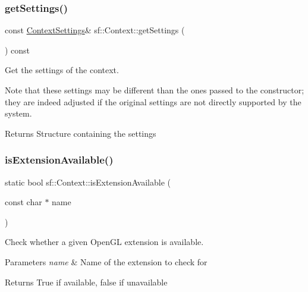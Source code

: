 \subsubsection{\texorpdfstring{getSettings()}{getSettings()}}
{\footnotesize\ttfamily const \mbox{\hyperlink{structsf_1_1_context_settings}{Context\+Settings}}\& sf\+::\+Context\+::get\+Settings (\begin{DoxyParamCaption}{ }\end{DoxyParamCaption}) const}



Get the settings of the context. 

Note that these settings may be different than the ones passed to the constructor; they are indeed adjusted if the original settings are not directly supported by the system.

\begin{DoxyReturn}{Returns}
Structure containing the settings \begin{DoxyVerb}\end{DoxyVerb}
 
\end{DoxyReturn}
\mbox{\label{classsf_1_1_context_a163c7f72c0c20133606657d895faa147}} 
\subsubsection{\texorpdfstring{isExtensionAvailable()}{isExtensionAvailable()}}
{\footnotesize\ttfamily static bool sf\+::\+Context\+::is\+Extension\+Available (\begin{DoxyParamCaption}\item[{const char $\ast$}]{name }\end{DoxyParamCaption})\hspace{0.3cm}{\ttfamily [static]}}



Check whether a given Open\+GL extension is available. 


\begin{DoxyParams}{Parameters}
{\em name} & Name of the extension to check for\\
\hline
\end{DoxyParams}
\begin{DoxyReturn}{Returns}
True if available, false if unavailable \begin{DoxyVerb}\end{DoxyVerb}
 
\end{DoxyReturn}
\mbox{\label{classsf_1_1_context_a0806f915ea81ae1f4e8135a7a3696562}} 
